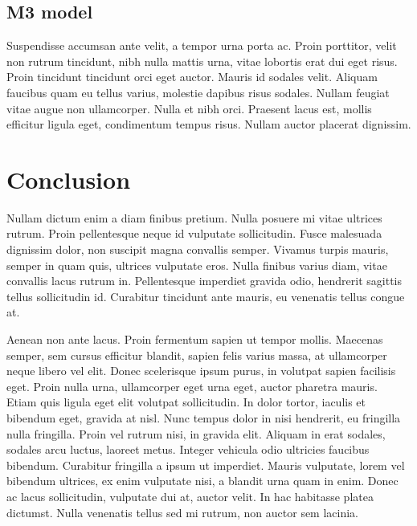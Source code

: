 \documentclass{article}
\begin{document}
\subsection{M3 model}

Suspendisse accumsan ante velit, a tempor urna porta ac. Proin porttitor, velit non rutrum tincidunt, nibh nulla mattis urna, vitae lobortis erat dui eget risus. Proin tincidunt tincidunt orci eget auctor. Mauris id sodales velit. Aliquam faucibus quam eu tellus varius, molestie dapibus risus sodales. Nullam feugiat vitae augue non ullamcorper. Nulla et nibh orci. Praesent lacus est, mollis efficitur ligula eget, condimentum tempus risus. Nullam auctor placerat dignissim.

\section{Conclusion}

Nullam dictum enim a diam finibus pretium. Nulla posuere mi vitae ultrices rutrum. Proin pellentesque neque id vulputate sollicitudin. Fusce malesuada dignissim dolor, non suscipit magna convallis semper. Vivamus turpis mauris, semper in quam quis, ultrices vulputate eros. Nulla finibus varius diam, vitae convallis lacus rutrum in. Pellentesque imperdiet gravida odio, hendrerit sagittis tellus sollicitudin id. Curabitur tincidunt ante mauris, eu venenatis tellus congue at.

Aenean non ante lacus. Proin fermentum sapien ut tempor mollis. Maecenas semper, sem cursus efficitur blandit, sapien felis varius massa, at ullamcorper neque libero vel elit. Donec scelerisque ipsum purus, in volutpat sapien facilisis eget. Proin nulla urna, ullamcorper eget urna eget, auctor pharetra mauris. Etiam quis ligula eget elit volutpat sollicitudin. In dolor tortor, iaculis et bibendum eget, gravida at nisl. Nunc tempus dolor in nisi hendrerit, eu fringilla nulla fringilla. Proin vel rutrum nisi, in gravida elit. Aliquam in erat sodales, sodales arcu luctus, laoreet metus. Integer vehicula odio ultricies faucibus bibendum. Curabitur fringilla a ipsum ut imperdiet. Mauris vulputate, lorem vel bibendum ultrices, ex enim vulputate nisi, a blandit urna quam in enim. Donec ac lacus sollicitudin, vulputate dui at, auctor velit. In hac habitasse platea dictumst. Nulla venenatis tellus sed mi rutrum, non auctor sem lacinia.
\end{document}
